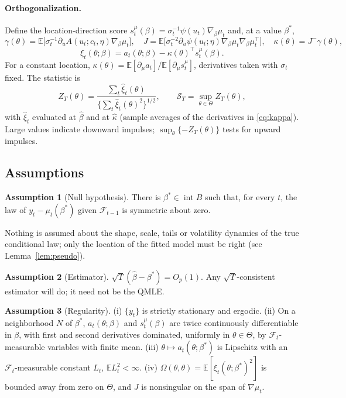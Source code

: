 \documentclass[11pt,a4paper]{article}
\theoremstyle{definition}
\newtheorem{assumption}{Assumption}
\theoremstyle{remark}
\newcommand{\E}{\mathbb{E}}
\newcommand{\F}{\mathcal{F}}
\newcommand{\tr}{^{\top}}
\begin{document}
\paragraph{Orthogonalization.} Define the location-direction score $s^\mu_t(\beta)=\sigma_t^{-1}\psi(u_t)\nabla_\beta\mu_t$ and, at a value $\beta^*$,
\begin{equation}\label{eq:kappa}
\gamma(\theta)=\E\big[\sigma_t^{-1}\partial_uA(u_t;c_t,\eta)\nabla_\beta\mu_t\big],\quad
J=\E\big[\sigma_t^{-2}\partial_u\psi(u_t;\eta)\nabla_\beta\mu_t\nabla_\beta\mu_t\tr\big],\quad
\kappa(\theta)=J^{-}\gamma(\theta),
\end{equation}
\begin{equation}\label{eq:xi}
\xi_t(\theta;\beta)=a_t(\theta;\beta)-\kappa(\theta)\tr s^\mu_t(\beta).
\end{equation}
For a constant location, $\kappa(\theta)=\E[\partial_\mu a_t]/\E[\partial_\mu s^\mu_t]$, derivatives taken with $\sigma_t$ fixed. The statistic is
\begin{equation}\label{eq:stat}
Z_T(\theta)=\frac{\sum_t\hat\xi_t(\theta)}{\{\sum_t\hat\xi_t(\theta)^2\}^{1/2}},\qquad \mathcal S_T=\sup_{\theta\in\Theta}Z_T(\theta),
\end{equation}
with $\hat\xi_t$ evaluated at $\hat\beta$ and at $\hat\kappa$ (sample averages of the derivatives in \eqref{eq:kappa}). Large values indicate downward impulses; $\sup_\theta\{-Z_T(\theta)\}$ tests for upward impulses.

\subsection{Assumptions}
\begin{assumption}[Null hypothesis]\label{A:null}
There is $\beta^*\in\operatorname{int}B$ such that, for every $t$, the law of $y_t-\mu_t(\beta^*)$ given $\F_{t-1}$ is symmetric about zero.
\end{assumption}
\noindent Nothing is assumed about the shape, scale, tails or volatility dynamics of the true conditional law; only the location of the fitted model must be right (see Lemma~\ref{lem:pseudo}).

\begin{assumption}[Estimator]\label{A:est}
$\sqrt T(\hat\beta-\beta^*)=O_p(1)$. Any $\sqrt T$-consistent estimator will do; it need not be the QMLE.
\end{assumption}

\begin{assumption}[Regularity]\label{A:reg}
(i) $\{y_t\}$ is strictly stationary and ergodic. (ii) On a neighborhood $N$ of $\beta^*$, $a_t(\theta;\beta)$ and $s^\mu_t(\beta)$ are twice continuously differentiable in $\beta$, with first and second derivatives dominated, uniformly in $\theta\in\Theta$, by $\F_t$-measurable variables with finite mean. (iii) $\theta\mapsto a_t(\theta;\beta^*)$ is Lipschitz with an $\F_t$-measurable constant $L_t$, $\E L_t^2<\infty$. (iv) $\Omega(\theta,\theta)=\E[\xi_t(\theta;\beta^*)^2]$ is bounded away from zero on $\Theta$, and $J$ is nonsingular on the span of $\nabla\mu_t$.
\end{assumption}
\end{document}
